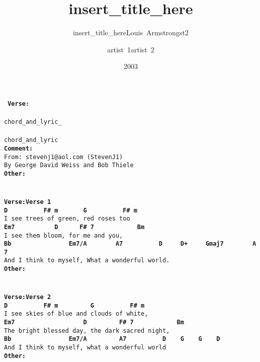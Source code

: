 \documentclass{scrartcl}
\title{insert\_title\_here}
\subtitle{insert\_title\_hereLouis~Armstrongst2}\author{artist~1artist~2}
\date{2003}
\begin{document}
\maketitle
\texttt{
\textbf{Verse:} \\
\textbf{ } \\
chord\_and\_lyric\_ \\
\textbf{ } \\
chord\_and\_lyric \\
\textbf{Comment:} \\
From:~stevenj1@aol.com~(StevenJ1) \\
By~George~David~Weiss~and~Bob~Thiele \\
\textbf{Other:} \\
\textbf{ } \\
 \\
\textbf{Verse:Verse 1} \\
\textbf{ \hspace*{5em}D~~~~~~~~~~F\#~m~~~~~~~G~~~~~~~~~~F\#~m} \\
I~see~trees~of~green,~red~roses~too \\
\textbf{ Em7~~~~~~~~~~~D~~~~~~F\#~7~~~~~~~~~~~~Bm} \\
I~see~them~bloom,~for~me~and~you, \\
\textbf{ \hspace*{6em}Bb~~~~~~~~~~~~~~~~Em7/A~~~~~~~~A7~~~~~~~~~~D~~~~~D+~~~~~Gmaj7~~~~~~~~A7} \\
And~I~think~to~myself,~What~a~wonderful~world. \\
\textbf{Other:} \\
\textbf{ } \\
 \\
\textbf{Verse:Verse 2} \\
\textbf{ \hspace*{5em}D~~~~~~~~~~F\#~m~~~~~~~~~G~~~~~~~~~~F\#~m} \\
I~see~skies~of~blue~and~clouds~of~white, \\
\textbf{ Em7~~~~~~~~~~~~~~~~~~~D~~~~~~~~~F\#~7~~~~~~~~~~~~Bm} \\
The~bright~blessed~day,~the~dark~sacred~night, \\
\textbf{ \hspace*{6em}Bb~~~~~~~~~~~~~~~~Em7/A~~~~~~~~~A7~~~~~~~~~~D~~~~G~~~~G~~~~D} \\
And~I~think~to~myself,~what~a~wonderful~world \\
\textbf{Other:} \\
\textbf{ } \\
 \\
}
\end{document}
